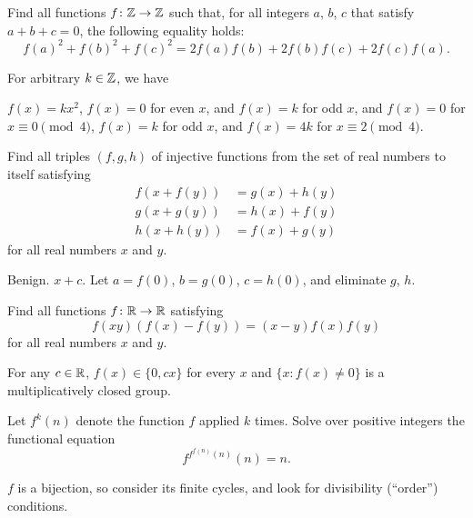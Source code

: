 \documentclass[11pt]{scrartcl}
\begin{document}
\begin{problem}
  [IMO 2012/4]
  Find all functions $f \colon \mathbb Z \to \mathbb Z$ such that,
  for all integers $a$, $b$, $c$ that satisfy $a+b+c=0$,
  the following equality holds:
  \[ f(a)^2+f(b)^2+f(c)^2 = 2f(a)f(b)+2f(b)f(c)+2f(c)f(a). \]
  \begin{hint}
    For arbitrary $k \in \mathbb Z$, we have
    \begin{enumerate}[(i)]
      \ii $f(x) = kx^2$,
      \ii $f(x) = 0$ for even $x$, and $f(x) = k$ for odd $x$, and
      \ii $f(x) = 0$ for $x \equiv 0 \pmod 4$, $f(x) = k$ for odd $x$, and $f(x) = 4k$ for $x \equiv 2 \pmod 4$.
    \end{enumerate}
  \end{hint}
\end{problem}

\begin{problem}
  [ELMO 2014]
  Find all triples $(f,g,h)$ of injective functions from the set of real numbers to itself satisfying
  \begin{align*}
    f(x+f(y)) &= g(x) + h(y) \\
    g(x+g(y)) &= h(x) + f(y) \\
    h(x+h(y)) &= f(x) + g(y)
  \end{align*}
  for all real numbers $x$ and $y$.
  \begin{hint}
    Benign. $x+c$.
    Let $a=f(0)$, $b=g(0)$, $c=h(0)$, and eliminate $g$, $h$.
  \end{hint}
\end{problem}

\begin{problem}
  [Shortlist 2001 A4]
  Find all functions $f \colon \mathbb R \to \mathbb R$ satisfying
  \[ f(xy)(f(x) - f(y)) = (x-y)f(x)f(y) \]
  for all real numbers $x$ and $y$.
  \label{prob:group}
  \begin{hint}
    For any $c \in \mathbb R$, $f(x) \in \{0,cx\}$ for every $x$
    and $\{ x : f(x) \neq 0 \}$ is a multiplicatively closed group.
  \end{hint}
\end{problem}

\begin{problem}
  \label{prob:fff}
  Let $f^k(n)$ denote the function $f$ applied $k$ times.
  Solve over positive integers the functional equation
  \[ f^{f^{f(n)}(n)}(n) = n. \]
  \begin{hint}
    $f$ is a bijection, so consider its finite cycles,
    and look for divisibility (``order'') conditions.
  \end{hint}
\end{problem}
\end{document}
